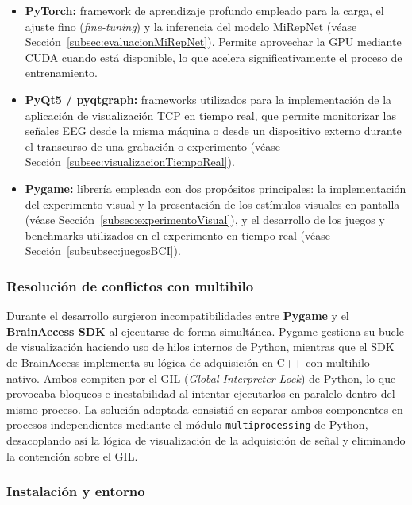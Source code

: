 \begin{itemize}
\item \textbf{PyTorch:} framework de aprendizaje profundo empleado para la carga, el ajuste fino (\textit{fine-tuning}) y la inferencia del modelo MiRepNet (véase Sección~\ref{subsec:evaluacionMiRepNet}). Permite aprovechar la GPU mediante CUDA cuando está disponible, lo que acelera significativamente el proceso de entrenamiento.

\item \textbf{PyQt5 / pyqtgraph:} frameworks utilizados para la implementación de la aplicación de visualización TCP en tiempo real, que permite monitorizar las señales EEG desde la misma máquina o desde un dispositivo externo durante el transcurso de una grabación o experimento (véase Sección~\ref{subsec:visualizacionTiempoReal}).

\item \textbf{Pygame:} librería empleada con dos propósitos principales: la implementación del experimento visual y la presentación de los estímulos visuales en pantalla (véase Sección~\ref{subsec:experimentoVisual}), y el desarrollo de los juegos y benchmarks utilizados en el experimento en tiempo real (véase Sección~\ref{subsubsec:juegosBCI}).

\end{itemize}

\subsubsection{Resolución de conflictos con multihilo}
\label{subsubsec:multithread}

Durante el desarrollo surgieron incompatibilidades entre \textbf{Pygame} y el \textbf{BrainAccess SDK} al ejecutarse de forma simultánea. Pygame gestiona su bucle de visualización haciendo uso de hilos internos de Python, mientras que el SDK de BrainAccess implementa su lógica de adquisición en C++ con multihilo nativo. Ambos compiten por el GIL (\textit{Global Interpreter Lock}) de Python, lo que provocaba bloqueos e inestabilidad al intentar ejecutarlos en paralelo dentro del mismo proceso. La solución adoptada consistió en separar ambos componentes en procesos independientes mediante el módulo \texttt{multiprocessing} de Python, desacoplando así la lógica de visualización de la adquisición de señal y eliminando la contención sobre el GIL.

\subsubsection{Instalación y entorno}
\label{subsubsec:instalacion}

